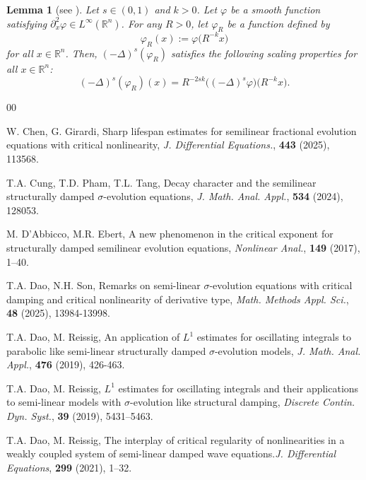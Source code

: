 \documentclass[11pt,reqno]{amsart}
\numberwithin{equation}{section}
\newtheorem{lemma}[theorem]{Lemma}
\begin{document}
\begin{lemma}[see \cite{Anhblowup}]\label{lem_scaling} 
Let $s\in (0,1)$ and $k>0$. Let $\varphi$ be a smooth function satisfying $\partial^2_x\varphi\in L^{\infty}(\mathbb{R}^n)$. For any $R>0$, let $\varphi_R$ be a function defined by
\[
\varphi_R(x):=\varphi\big(R^{-k}x\big)
\]
for all $x\in \mathbb{R}^n$. Then, $(-\Delta)^s(\varphi_R)$ satisfies the following scaling properties for all $x\in \mathbb{R}^n$:
\[
(-\Delta)^s(\varphi_R)(x)=R^{-2sk}\big((-\Delta)^{s}\varphi\big)\big(R^{-k}x\big).
\]
\end{lemma}



\begin{thebibliography}{00}


 W. Chen, G. Girardi, Sharp lifespan estimates for semilinear fractional evolution equations with critical nonlinearity, {\it J. Differential Equations.}, \textbf{443} (2025), 113568.

 T.A. Cung, T.D. Pham, T.L. Tang, Decay character and the semilinear structurally damped $\sigma$-evolution equations, \textit{J. Math. Anal. Appl.}, {\bf534} (2024), 128053.

 M. D’Abbicco, M.R. Ebert, A new phenomenon in the critical exponent for structurally damped semilinear evolution equations, {\it Nonlinear Anal.}, {\bf149} (2017), 1–40.

 T.A. Dao, N.H. Son, Remarks on semi-linear $\sigma$-evolution equations with critical damping and critical nonlinearity of derivative type, \textit{Math. Methods Appl. Sci.}, \textbf{48} (2025), 13984-13998.

 T.A. Dao, M. Reissig, An application of $L^1$ estimates for oscillating integrals to parabolic like semi-linear structurally damped $\sigma$-evolution models, \textit{J. Math. Anal. Appl.}, {\bf476} (2019), 426-463.

 T.A. Dao, M. Reissig, $L^1$
estimates for oscillating integrals and their applications to semi-linear models with $\sigma$-evolution like structural damping, \textit{Discrete Contin. Dyn. Syst.}, {\bf39} (2019), 5431–5463.

 T.A. Dao, M. Reissig, The interplay of critical regularity of nonlinearities in a weakly coupled system of semi-linear damped wave equations.{\it J. Differential Equations}, {\bf299} (2021), 1–32.


\end{thebibliography}
\end{document}
